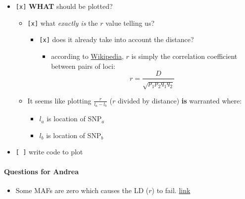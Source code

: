 \documentclass[letterpaper]{scrartcl}
\begin{document}
\begin{itemize}
\itemsep1pt\parskip0pt
\item
  \texttt{{[}x{]}} \textbf{WHAT} should be plotted?

  \begin{itemize}
  \itemsep1pt\parskip0pt
  \item
    \texttt{{[}x{]}} what \emph{exactly is} the \(r\) value telling us?

    \begin{itemize}
    \itemsep1pt\parskip0pt
    \item
      \texttt{{[}x{]}} does it already take into account the distance?

      \begin{itemize}
      \itemsep1pt\parskip0pt
      \item
        according to
        \href{http://en.wikipedia.org/wiki/Linkage_disequilibrium\#Definition}{Wikipedia},
        \(r\) is simply the correlation coefficient between pairs of
        loci: \[r=\frac{D}{\sqrt{p_1p_2q_1q_2}}\]
      \end{itemize}
    \end{itemize}
  \item
    It seems like plotting \(\frac{r}{l_{a} - l_{b}}\) (\(r\) divided by
    distance) \textbf{is} warranted where:

    \begin{itemize}
    \itemsep1pt\parskip0pt
    \item
      \(l_{a}\) is location of SNP\(_{a}\)
    \item
      \(l_{b}\) is location of SNP\(_{b}\)
    \end{itemize}
  \end{itemize}
\item
  \texttt{{[} {]}} write code to plot
\end{itemize}

\paragraph{Questions for Andrea}\label{questions-for-andrea}

\begin{itemize}
\itemsep1pt\parskip0pt
\item
  Some MAFs are zero which causes the LD (\(r\)) to fail.
  \href{http://localhost:8888/jupiter/notebooks/YALE/ddrad58/2015-01-02_Plot_PLINK_results.ipynb\#LD-as-r-for-Scaffold0:}{link}
\end{itemize}
\end{document}
